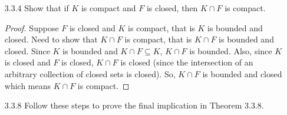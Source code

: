 \documentclass[12pt,letterpaper]{article}
\begin{document}
\begin{itemize}[leftmargin=!,labelindent=5pt]
\begin{itemize}
                (i) The union of a finite collection of closed sets is closed.
                    \begin{proof}
                        Suppose $\{E_\lambda : \lambda \in \Lambda\}$ is a collection of closed sets.
                        Then, $\{E_\lambda : \lambda \in \Lambda\}^c$ is a collection of open sets and we know that the intersection of a finite amount of open sets is open (Theorem 3.2.3).
                        So, taking the complement again $(\{E_\lambda : \lambda \in \Lambda\}^c)^c = \{E_\lambda : \lambda \in \Lambda\}$ gives us a closed set (since the complement of an open set is a closed set) as desired.
                    \end{proof}
                (ii) The intersection of an arbitrary collection of closed sets is closed.
                    \begin{proof}
                        Suppose $\{E_\lambda : \lambda \in \Lambda\}$ is an arbitrary collection of closed sets.
                        Then, $E_{\lambda}^c$ is open and $\forall \lambda \in \Lambda$, the union of $E_{\lambda}^c$ is open (Theorem 3.2.3).
                        By De Morgan's Law, we know $\bigcup_{\lambda \in \Lambda} E_{\lambda}^c = (\bigcap_{\lambda \in \Lambda} E_\lambda)^c$ so $(\bigcap_{\lambda \in \Lambda} E_\lambda)^c$ is open.
                        Then, $\bigcap_{\lambda \in \Lambda} E_\lambda$ is closed.
                        Thus, the intersection of an arbitrary collection of closed sets is closed.
                    \end{proof}
            \end{itemize}
        \item [3.3.4] Show that if $K$ is compact and $F$ is closed, then $K \cap F$ is compact.
        
            \begin{proof}
                Suppose $F$ is closed and $K$ is compact, that is $K$ is bounded and closed.
                Need to show that $K \cap F$ is compact, that is $K \cap F$ is bounded and closed.
                Since $K$ is bounded and $K \cap F \subseteq K$, $K \cap F$ is bounded.
                Also, since $K$ is closed and $F$ is closed, $K \cap F$ is closed (since the intersection of an arbitrary collection of closed sets is closed).
                So, $K \cap F$ is bounded and closed which means $K \cap F$ is compact.
            \end{proof}
        \item [3.3.8] Follow these steps to prove the final implication in Theorem 3.3.8.
            

\end{itemize}
\end{document}
